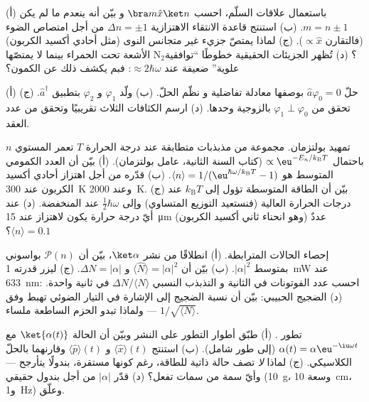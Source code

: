\begin{exercise}[$\star$]\label{exo:b3:harmonic-oscillator:4}
(أ) باستعمال علاقات السلّم، احسب $\bra m\hat x\ket n$ و
بيّن أنه ينعدم ما لم يكن $m = n \pm 1$. (ب) استنتج قاعدة
الانتقاء الاهتزازية $\Delta n = \pm1$ من أجل امتصاص الضوء (فالتقارن
$\propto\hat x$). (ج) لماذا يمتصّ جزيء غير متجانس النوى (مثل أحادي أكسيد الكربون)
الأشعة تحت الحمراء بينما لا يمتصّها N$_2$؟ (د) تُظهر الجزيئات الحقيقية
خطوطًا ``توافقية علوية'' ضعيفة عند $\approx 2\hbar\omega$: فبم يكشف ذلك
عن الكمون؟
\end{exercise}

\begin{exercise}[$\star\star$]\label{exo:b3:harmonic-oscillator:5}
(أ) حلّ $\hat a\varphi_0 = 0$ بوصفها معادلة تفاضلية و
نظّم الحلّ. (ب) ولّد $\varphi_1$ و $\varphi_2$ بتطبيق
$\hat a^\dagger$. (ج) تحقق من $\varphi_1 \perp \varphi_0$ بالزوجية
وحدها. (د) ارسم الكثافات الثلاث تقريبيًا وتحقق من عدد العقد.
\end{exercise}

\begin{exercise}[$\star\star$]\label{exo:b3:harmonic-oscillator:6}
تمهيد بولتزمان. مجموعة من مذبذبات متطابقة عند
درجة الحرارة $T$ تعمر المستوي $n$ باحتمال $\propto
\eu^{-E_n/k_{\text{B}}T}$ (كتاب السنة الثانية، عامل بولتزمان). (أ)
بيّن أن العدد الكمومي المتوسط هو $\langle n\rangle =
1/(\eu^{\hbar\omega/k_{\text{B}}T} - 1)$. (ب) قدّره من أجل اهتزاز
أحادي أكسيد الكربون عند \qty{300}{K} وعند \qty{2000}{K}. (ج) بيّن أن الطاقة
المتوسطة تؤول إلى $k_{\text{B}}T$ عند درجات الحرارة العالية (فنستعيد
التوزيع المتساوي) وإلى $\tfrac12\hbar\omega$ عند المنخفضة. (د) عند أيّ
درجة حرارة يكون لاهتزاز عند \qty{15}{\micro m} (وهو انحناء ثاني
أكسيد الكربون) عددٌ $\langle n\rangle = 0.1$؟
\end{exercise}

\begin{exercise}[$\star\star$]\label{exo:b3:harmonic-oscillator:7}
إحصاء الحالات المترابطة. (أ) انطلاقًا من نشر $\ket\alpha$،
بيّن أن $\mathcal P(n)$ بواسوني بمتوسط $|\alpha|^2$. (ب) بيّن أن
$\langle\hat N\rangle = |\alpha|^2$ و $\Delta N = |\alpha|$. (ج)
ليزر قدرته \qty{1}{mW} عند \qty{633}{nm}: احسب عدد الفوتونات في الثانية و
التذبذب النسبي $\Delta N/\langle N\rangle$ في ثانية واحدة. (د)
الضجيج الحبيبي: بيّن أن نسبة الضجيج إلى الإشارة في التيار الضوئي تهبط وفق
$1/\sqrt{\langle N\rangle}$ --- ولماذا تبدو الحزم الساطعة ملساء.
\end{exercise}

\begin{exercise}[$\star\star$]\label{exo:b3:harmonic-oscillator:8}
تطور . (أ) طبّق أطوار التطور على
النشر وبيّن أن الحالة $\ket{\alpha(t)}$ مع $\alpha(t) =
\alpha\eu^{-\iu\omega t}$ (إلى طور شامل). (ب) استنتج
$\langle\hat x\rangle(t)$ و $\langle\hat p\rangle(t)$ وقارنهما
بالحلّ الكلاسيكي. (ج) لماذا \emph{لا} تصف حالة ذاتية للطاقة،
رغم كونها مستقرة، بندولًا يتأرجح --- وأيّ سمة من سمات  تفعل؟ (د) قدّر $|\alpha|$
من أجل بندول حقيقي (\qty{10}{g}، وسعة \qty{10}{cm}،
و\qty{1}{Hz}) وعلّق.
\end{exercise}

